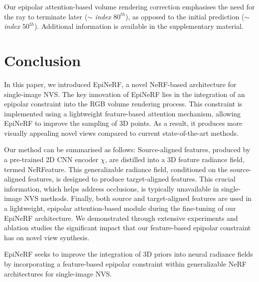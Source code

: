 Our epipolar attention-based volume rendering correction emphasises the need for the ray to terminate later ($\sim$ \textit{index} $80^{th}$), as opposed to the initial prediction ($\sim$ \textit{index} $50^{th}$). Additional information is available in the supplementary material.

\section{Conclusion}

In this paper, we introduced EpiNeRF, a novel NeRF-based architecture for single-image NVS. The key innovation of EpiNeRF lies in the integration of an epipolar constraint into the RGB volume rendering process. This constraint is implemented using a lightweight feature-based attention mechanism, allowing EpiNeRF to improve the sampling of 3D points. As a result, it produces more visually appealing novel views compared to current state-of-the-art methods.

Our method can be summarised as follows: Source-aligned features, produced by a pre-trained 2D CNN encoder $\chi$, are distilled into a 3D feature radiance field, termed NeRFeature. This generalizable radiance field, conditioned on the source-aligned features, is designed to produce target-aligned features. This crucial information, which helps address occlusions, is typically unavailable in single-image NVS methods. Finally, both source and target-aligned features are used in a lightweight, epipolar attention-based module during the fine-tuning of our EpiNeRF architecture. We demonstrated through extensive experiments and ablation studies the significant impact that our feature-based epipolar constraint has on novel view synthesis.

EpiNeRF seeks to improve the integration of 3D priors into neural radiance fields by incorporating a feature-based epipolar constraint within generalizable NeRF architectures for single-image NVS.
